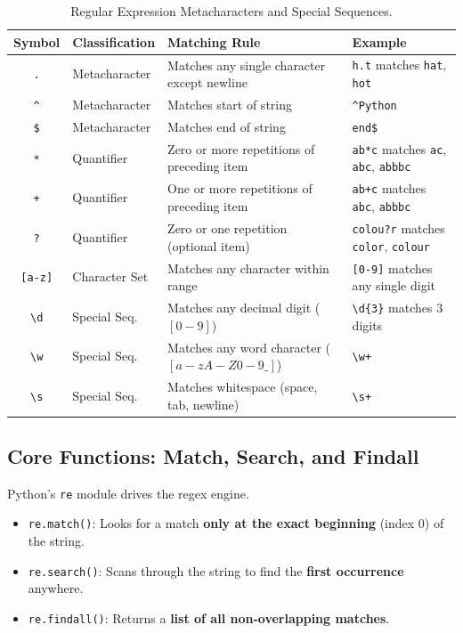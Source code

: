 \begin{table}[htbp]
\centering
\small
\renewcommand{\arraystretch}{1.2}
\begin{tabularx}{\linewidth}{cl>{\raggedright\arraybackslash}Xl}
\toprule
\textbf{Symbol} & \textbf{Classification} & \textbf{Matching Rule} & \textbf{Example} \\
\midrule
\texttt{.} & Metacharacter & Matches any single character except newline & \texttt{h.t} matches \texttt{hat}, \texttt{hot} \\
\texttt{\textasciicircum} & Metacharacter & Matches start of string & \texttt{\textasciicircum Python} \\
\texttt{\$} & Metacharacter & Matches end of string & \texttt{end\$} \\
\texttt{*} & Quantifier & Zero or more repetitions of preceding item & \texttt{ab*c} matches \texttt{ac}, \texttt{abc}, \texttt{abbbc} \\
\texttt{+} & Quantifier & One or more repetitions of preceding item & \texttt{ab+c} matches \texttt{abc}, \texttt{abbbc} \\
\texttt{?} & Quantifier & Zero or one repetition (optional item) & \texttt{colou?r} matches \texttt{color}, \texttt{colour} \\
\texttt{[a-z]} & Character Set & Matches any character within range & \texttt{[0-9]} matches any single digit \\
\texttt{\textbackslash d} & Special Seq. & Matches any decimal digit ($[0-9]$) & \texttt{\textbackslash d\{3\}} matches 3 digits \\
\texttt{\textbackslash w} & Special Seq. & Matches any word character ($[a-zA-Z0-9\_]$) & \texttt{\textbackslash w+} \\
\texttt{\textbackslash s} & Special Seq. & Matches whitespace (space, tab, newline) & \texttt{\textbackslash s+} \\
\bottomrule
\end{tabularx}
\caption{Regular Expression Metacharacters and Special Sequences.}
\label{tab:regex-symbols}
\end{table}

\subsection{Core Functions: Match, Search, and Findall}

Python's \texttt{re} module drives the regex engine. 
\begin{itemize}[leftmargin=1.5em]
    \item \texttt{re.match()}: Looks for a match \textbf{only at the exact beginning} (index 0) of the string.
    \item \texttt{re.search()}: Scans through the string to find the \textbf{first occurrence} anywhere.
    \item \texttt{re.findall()}: Returns a \textbf{list of all non-overlapping matches}.
\end{itemize}

